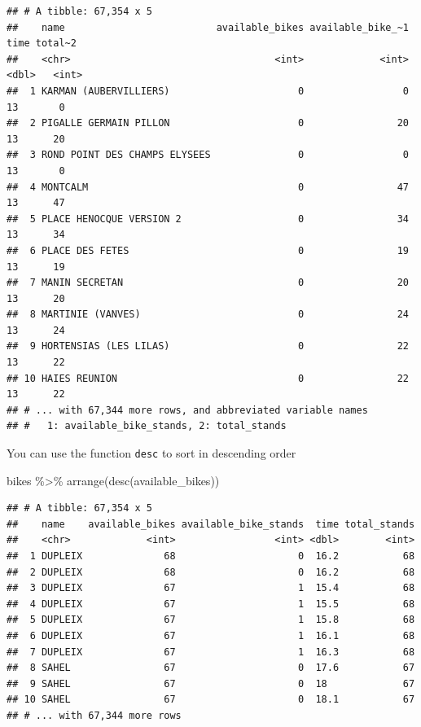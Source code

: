\documentclass[
]{book}
\newenvironment{Shaded}{\begin{snugshade}}{\end{snugshade}}
\newcommand{\FunctionTok}[1]{\textcolor[rgb]{0.00,0.00,0.00}{#1}}
\newcommand{\NormalTok}[1]{#1}
\newcommand{\SpecialCharTok}[1]{\textcolor[rgb]{0.00,0.00,0.00}{#1}}
\begin{document}
\begin{verbatim}
## # A tibble: 67,354 x 5
##    name                          available_bikes available_bike_~1  time total~2
##    <chr>                                   <int>             <int> <dbl>   <int>
##  1 KARMAN (AUBERVILLIERS)                      0                 0    13       0
##  2 PIGALLE GERMAIN PILLON                      0                20    13      20
##  3 ROND POINT DES CHAMPS ELYSEES               0                 0    13       0
##  4 MONTCALM                                    0                47    13      47
##  5 PLACE HENOCQUE VERSION 2                    0                34    13      34
##  6 PLACE DES FETES                             0                19    13      19
##  7 MANIN SECRETAN                              0                20    13      20
##  8 MARTINIE (VANVES)                           0                24    13      24
##  9 HORTENSIAS (LES LILAS)                      0                22    13      22
## 10 HAIES REUNION                               0                22    13      22
## # ... with 67,344 more rows, and abbreviated variable names
## #   1: available_bike_stands, 2: total_stands
\end{verbatim}

You can use the function \texttt{desc} to sort in descending order

\begin{Shaded}
\begin{Highlighting}[]
\NormalTok{bikes }\SpecialCharTok{\%\textgreater{}\%}
  \FunctionTok{arrange}\NormalTok{(}\FunctionTok{desc}\NormalTok{(available\_bikes))}
\end{Highlighting}
\end{Shaded}

\begin{verbatim}
## # A tibble: 67,354 x 5
##    name    available_bikes available_bike_stands  time total_stands
##    <chr>             <int>                 <int> <dbl>        <int>
##  1 DUPLEIX              68                     0  16.2           68
##  2 DUPLEIX              68                     0  16.2           68
##  3 DUPLEIX              67                     1  15.4           68
##  4 DUPLEIX              67                     1  15.5           68
##  5 DUPLEIX              67                     1  15.8           68
##  6 DUPLEIX              67                     1  16.1           68
##  7 DUPLEIX              67                     1  16.3           68
##  8 SAHEL                67                     0  17.6           67
##  9 SAHEL                67                     0  18             67
## 10 SAHEL                67                     0  18.1           67
## # ... with 67,344 more rows
\end{verbatim}
\end{document}
